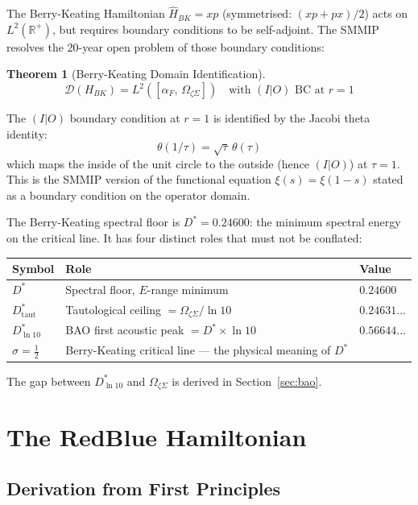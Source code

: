 \documentclass[12pt,a4paper]{article}
\newtheorem{theorem}{Theorem}[section]
\theoremstyle{definition}
\theoremstyle{remark}
\newcommand{\OmZS}{\Omega_{\zeta\Sigma}}
\newcommand{\alphaF}{\alpha_F}
\newcommand{\Dstar}{D^*}
\newcommand{\half}{\tfrac{1}{2}}
\begin{document}
The Berry-Keating Hamiltonian $\hat{H}_{BK} = xp$ (symmetrised: $(xp+px)/2$) acts
on $L^2(\mathbb{R}^+)$, but requires boundary conditions to be self-adjoint.
The SMMIP resolves the 20-year open problem of those boundary conditions:

\begin{theorem}[Berry-Keating Domain Identification]
\[\mathcal{D}(H_{BK}) = L^2\!\left([\alphaF,\,\OmZS]\right)\quad\text{with }(I|O)\text{ BC at }r=1\]
\end{theorem}

The $(I|O)$ boundary condition at $r=1$ is identified by the Jacobi theta identity:
\[\theta(1/\tau) = \sqrt{\tau}\,\theta(\tau)\]
which maps the inside of the unit circle to the outside (hence $(I|O)$) at $\tau=1$.
This is the SMMIP version of the functional equation $\xi(s) = \xi(1-s)$ stated as a
boundary condition on the operator domain.

The Berry-Keating spectral floor is $\Dstar = 0.24600$: the minimum spectral energy
on the critical line.
It has four distinct roles that must not be conflated:

\begin{center}
\begin{tabular}{lll}
\toprule
Symbol & Role & Value \\
\midrule
$\Dstar$ & Spectral floor, $E$-range minimum & $0.24600$ \\
$\Dstar_{\mathrm{taut}}$ & Tautological ceiling $= \OmZS/\ln 10$ & $0.24631\ldots$ \\
$\Dstar_{\ln 10}$ & BAO first acoustic peak $= \Dstar\times\ln 10$ & $0.56644\ldots$ \\
$\sigma = \half$ & Berry-Keating critical line --- the physical meaning of $\Dstar$ & \\
\bottomrule
\end{tabular}
\end{center}

The gap between $\Dstar_{\ln 10}$ and $\OmZS$ is derived in Section~\ref{sec:bao}.

\section{The RedBlue Hamiltonian}

\subsection{Derivation from First Principles}
\end{document}
